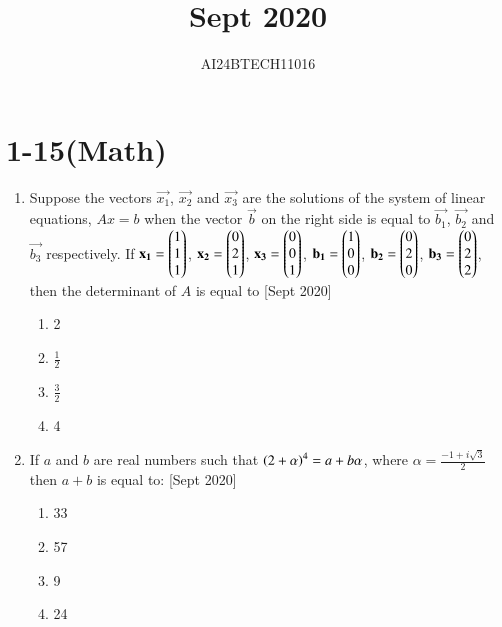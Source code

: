 \documentclass[journal]{IEEEtran}
\begin{document}

\title{Sept 2020}
\author{AI24BTECH11016}
{\let\newpage\relax\maketitle}
\renewcommand{\thefigure}{\theenumi}
\renewcommand{\thetable}{\theenumi}
\setlength{\intextsep}{10pt} %
\renewcommand{\thetable}{\theenumi}
\section{1-15(Math)}
\begin{enumerate}
	\item
	Suppose the vectors $\vec{x_1}$, $\vec{x_2}$ and $\vec{x_3}$ are the solutions of the system of linear equations, $Ax = b$ when the vector $\vec{b}$ on the right side is equal to $\vec{b_1}$, $\vec{b_2}$ and $\vec{b_3}$ respectively. If $\mathbf{x_1} = \begin{pmatrix}1 \\ 1 \\ 1\end{pmatrix}$, $\mathbf{x_2} = \begin{pmatrix}0 \\ 2 \\ 1\end{pmatrix}$, $\mathbf{x_3} = \begin{pmatrix}0 \\ 0 \\ 1\end{pmatrix}$, $\mathbf{b_1} = \begin{pmatrix}1 \\ 0 \\ 0\end{pmatrix}$, $\mathbf{b_2} = \begin{pmatrix}0 \\ 2 \\ 0\end{pmatrix}$, $\mathbf{b_3} = \begin{pmatrix}0 \\ 2 \\2\end{pmatrix}$, then the determinant of $A$ is equal to 
	\hfill [Sept 2020]
		\begin{enumerate}
			\item 2
			\item $\frac{1}{2}$
			\item $\frac{3}{2}$
			\item 4
		\end{enumerate}
	\item
	 If $a$ and $b$ are real numbers such that $\left(2+\alpha\right)^{4} = a+b\alpha$, where $\alpha = \frac{-1+i\sqrt{3}}{2}$ then $a+b$ is equal to:
	 \hfill [Sept 2020]
	 	\begin{enumerate}
	 		\item 33
	 		\item 57
	 		\item 9
	 		\item 24
	 	\end{enumerate}

\end{enumerate}
\end{document}
